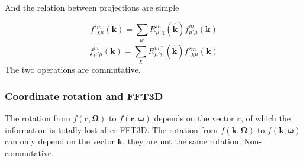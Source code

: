 And the relation between projections are simple

\[
f'{}_{\chi\mu}^{m}(\mathbf{k})=\sum_{\mu'}R_{\mu'\chi}^{m}(\hat{\mathbf{k}})f_{\mu'\mu}^{m}(\mathbf{k})
\]
\[
f_{\mu'\mu}^{m}(\mathbf{k})=\sum_{\chi}R_{\mu'\chi}^{m*}(\hat{\mathbf{k}})f'{}_{\chi\mu}^{m}(\mathbf{k})
\]
The two operations are commutative.


\subsubsection{Coordinate rotation and FFT3D}

The rotation from $f(\mathbf{r},\mathbf{\Omega})$ to $f(\mathbf{r},\boldsymbol{\omega})$
depends on the vector $\mathbf{r}$, of which the information is totally
lost after FFT3D. The rotation from $f(\mathbf{k},\mathbf{\Omega})$
to $f(\mathbf{k},\boldsymbol{\omega})$ can only depend on the vector
$\mathbf{k}$, they are not the same rotation. Non-commutative. 
